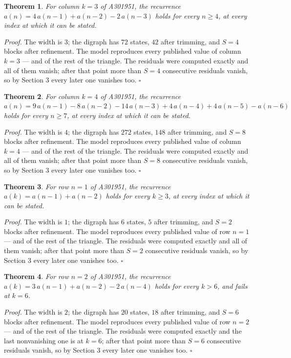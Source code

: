 \documentclass[11pt]{article}
\newtheorem{theorem}{Theorem}
\theoremstyle{definition}
\begin{document}
\begin{theorem} For column $k = 3$ of A301951, the recurrence $a(n) = 4\,a(n-1) + a(n-2) - 2\,a(n-3)$ holds for every $n \ge 4$, at every index at which it can be stated.\end{theorem}

{\itshape Proof.} The width is $3$; the digraph has $72$ states, $42$ after trimming, and $S = 4$ blocks after refinement. The model reproduces every published value of column $k = 3$ --- and of the rest of the triangle. The residuals were computed exactly and all of them vanish; after that point more than $S = 4$ consecutive residuals vanish, so by Section 3 every later one vanishes too. $\square$

\begin{theorem} For column $k = 4$ of A301951, the recurrence $a(n) = 9\,a(n-1) - 8\,a(n-2) - 14\,a(n-3) + 4\,a(n-4) + 4\,a(n-5) - a(n-6)$ holds for every $n \ge 7$, at every index at which it can be stated.\end{theorem}

{\itshape Proof.} The width is $4$; the digraph has $272$ states, $148$ after trimming, and $S = 8$ blocks after refinement. The model reproduces every published value of column $k = 4$ --- and of the rest of the triangle. The residuals were computed exactly and all of them vanish; after that point more than $S = 8$ consecutive residuals vanish, so by Section 3 every later one vanishes too. $\square$

\begin{theorem} For row $n = 1$ of A301951, the recurrence $a(k) = a(n-1) + a(n-2)$ holds for every $k \ge 3$, at every index at which it can be stated.\end{theorem}

{\itshape Proof.} The width is $1$; the digraph has $6$ states, $5$ after trimming, and $S = 2$ blocks after refinement. The model reproduces every published value of row $n = 1$ --- and of the rest of the triangle. The residuals were computed exactly and all of them vanish; after that point more than $S = 2$ consecutive residuals vanish, so by Section 3 every later one vanishes too. $\square$

\begin{theorem} For row $n = 2$ of A301951, the recurrence $a(k) = 3\,a(n-1) + a(n-2) - 2\,a(n-4)$ holds for every $k > 6$, and fails at $k = 6$.\end{theorem}

{\itshape Proof.} The width is $2$; the digraph has $20$ states, $18$ after trimming, and $S = 6$ blocks after refinement. The model reproduces every published value of row $n = 2$ --- and of the rest of the triangle. The residuals were computed exactly and the last nonvanishing one is at $k = 6$; after that point more than $S = 6$ consecutive residuals vanish, so by Section 3 every later one vanishes too. $\square$
\end{document}
